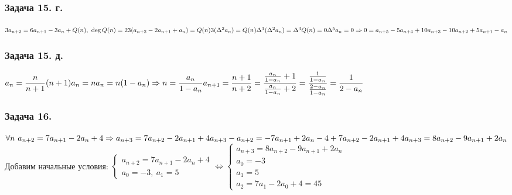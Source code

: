 \documentclass[12pt, letterpaper, twoside]{article}
\begin{document}
    \subsubsection*{Задача 15. г.}
    $3a_{n + 2} = 6a_{n + 1} - 3a_n + Q(n),\ \deg Q(n) = 2\\
    3(a_{n + 2} - 2a_{n + 1} +a_n) = Q(n)\\
    3(\Delta^2 a_n) = Q(n)\\
    \Delta^3(\Delta^2 a_n) = \Delta^3 Q(n) = 0\\
    \Delta^5 a_n = 0\Rightarrow 0 = a_{n + 5} - 5a_{n + 4} + 10a_{n + 3} - 10a_{n + 2} + 5a_{n + 1} - a_n$
    \subsubsection*{Задача 15. д.}
    $a_n = \dfrac{n}{n + 1}\\
    (n + 1)a_n = n\\
    a_n = n(1 - a_n)\Rightarrow n = \dfrac{a_n}{1 - a_n}\\
    a_{n + 1} = \dfrac{n + 1}{n + 2} = \dfrac{ \frac{a_n}{1 - a_n} + 1}{ \frac{a_n}{1 - a_n} + 2 } = \dfrac{\frac{1}{1 - a_n}}{\frac{2 - a_n}{1 - a_n}} = \dfrac{1}{2 - a_n}$
    \subsubsection*{Задача 16.}
    $\forall n\ a_{n + 2} = 7a_{n + 1} - 2a_n + 4\Rightarrow a_{n + 3} = 7a_{n + 2} - 2a_{n + 1} + 4\\
    a_{n + 3} - a_{n + 2} = -7a_{n + 1} + 2a_n - 4 + 7a_{n + 2} - 2a_{n + 1} + 4\\
    a_{n + 3} = 8a_{n + 2} - 9a_{n + 1} + 2a_n$\\
    Добавим начальные условия:
    $\begin{cases}
        a_{n + 2} = 7a_{n + 1} - 2a_n + 4\\
        a_0 = -3,\ a_1 = 5
    \end{cases}\Leftrightarrow \begin{cases}
        a_{n + 3} = 8a_{n + 2} - 9a_{n + 1} + 2a_n\\
        a_0 = -3\\
        a_1 = 5\\
        a_2 = 7a_1 - 2a_0 + 4 = 45 
    \end{cases}$\\
\end{document}
